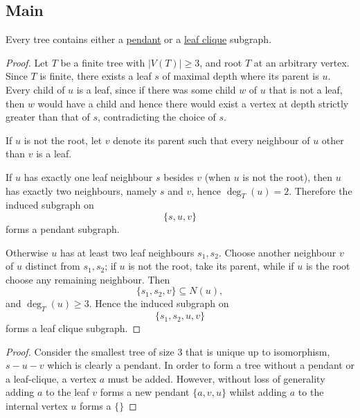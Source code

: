 \subsection{Main}


\begin{lemma} \label{lemma::tree_pendant_leaf_clique}
  Every tree contains either a \hyperref[def::pendant]{pendant} or a \hyperref[def::leaf_clique]{leaf clique} subgraph.
\end{lemma}
\begin{proof} 
  Let $T$ be a finite tree with $|V(T)|\ge 3$, and root $T$ at an arbitrary vertex. Since $T$ is finite, there exists a leaf $s$ of maximal depth where its parent is $u$. Every child of $u$ is a leaf, since if there was some child $w$ of $u$ that is not a leaf, then $w$ would have a child and hence there would exist a vertex at depth strictly greater than that of $s$, contradicting the choice of $s$.

  If $u$ is not the root, let $v$ denote its parent such that every neighbour of $u$ other than $v$ is a leaf.

  If $u$ has exactly one leaf neighbour $s$ besides $v$ (when $u$ is not the root), then $u$ has exactly two neighbours, namely $s$ and $v$, hence $\deg_T(u)=2$. Therefore the induced subgraph on
  \[
  \{s,u,v\}
  \]
  forms a pendant subgraph.

  Otherwise $u$ has at least two leaf neighbours $s_1,s_2$. Choose another neighbour $v$ of $u$ distinct from $s_1,s_2$; if $u$ is not the root, take its parent, while if $u$ is the root choose any remaining neighbour. Then
  \[
  \{s_1,s_2,v\}\subseteq N(u),
  \]
  and $\deg_T(u)\ge3$. Hence the induced subgraph on
  \[
  \{s_1,s_2,u,v\}
  \]
  forms a leaf clique subgraph.
\end{proof}
\begin{proof}
  Consider the smallest tree of size $3$ that is unique up to isomorphism, $s-u-v$ which is clearly a pendant. In order to form a tree without a pendant or a leaf-clique, a vertex $a$ must be added. However, without loss of generality adding $a$ to the leaf $v$ forms a new pendant $\{a,v,u\}$ whilst adding $a$ to the internal vertex $u$ forms a $\{\}$ 
\end{proof}
